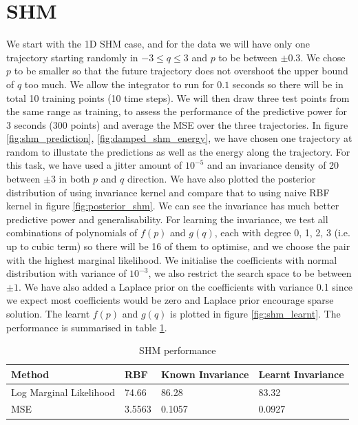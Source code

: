 \documentclass{statsmsc}
\begin{document}
\section{SHM}
We start with the 1D SHM case, and for the data we will have only one trajectory starting randomly in $-3\le q\le3$ and $p$ to be between $\pm 0.3$.
We chose $p$ to be smaller so that the future trajectory does not overshoot the upper bound of $q$ too much. 
We allow the integrator to run for $0.1$ seconds so there will be in total 10 training points (10 time steps). 
We will then draw three test points from the same range as training, to assess the performance of the predictive power for 3 seconds (300 points) and average the MSE over the three trajectories. 
In figure \ref{fig:shm_prediction}, \ref{fig:damped_shm_energy}, we have chosen one trajectory at random to illustate the predictions as well as the energy along the trajectory.
For this task, we have used a jitter amount of $10^{-5}$ and an invariance density of 20 between $\pm 3$ in both $p$ and $q$ direction.
We have also plotted the posterior distribution of using invariance kernel and compare that to using naive RBF kernel in figure \ref{fig:posterior_shm}.
We can see the invariance has much better predictive power and generalisability.
For learning the invariance, we test all combinations of polynomials of $f(p)$ and $g(q)$, each with degree 0, 1, 2, 3 (i.e. up to cubic term) so there will be 16 of them to optimise, and we choose the pair with the highest marginal likelihood. 
We initialise the coefficients with normal distribution with variance of $10^{-3}$, we also restrict the search space to be between $\pm 1$.
We have also added a Laplace prior on the coefficients with variance 0.1 since we expect most coefficients would be zero and Laplace prior encourage sparse solution.
The learnt $f(p)$ and $g(q)$ is plotted in figure \ref{fig:shm_learnt}.
The performance is summarised in table \ref{tab:shm_performance}.

\begin{table}[H]
  \centering
  \begin{tabular}{l l l l }
\hline
Method           & RBF & Known Invariance&  Learnt Invariance\\
  \hline
Log Marginal Likelihood & 74.66 & 86.28 & 83.32  \\
MSE & 3.5563 & 0.1057 & 0.0927 \\
                    \hline
  \end{tabular}
  \caption{SHM performance}
  \label{tab:shm_performance}
\end{table}
\end{document}
